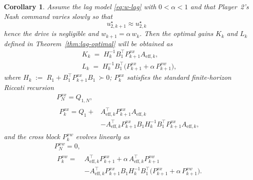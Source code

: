 \documentclass[letterpaper, 10 pt, conference]{ieeeconf}  %
\newtheorem{corollary}[theorem]{\textbf{Corollary}}
\begin{document}
\begin{corollary}
\label{cor:slow-varying-alpha}
Assume the lag model \eqref{eq:w-lag} with $0<\alpha<1$ and that Player~2’s Nash command varies slowly so that
\begin{equation}\label{eq:slow-drive}
u^{\star}_{2,k+1}\approx u^{\star}_{2,k}
\end{equation}
hence the drive is negligible and $w_{k+1} = \alpha\,w_k$. Then the optimal gains $K_k$ and $L_k$ defined in Theorem~\ref{thm:lag-optimal} will be obtained as
\begin{equation}
\begin{aligned}
&K_k \;=\; H_k^{-1} B_1^\top P_{k+1}^{xx} A_{\mathrm{eff},k}, \\
&L_k \;=\; H_k^{-1} B_1^\top \big(P_{k+1}^{xx} + \alpha\,P_{k+1}^{xw}\big), \label{eq:special case k}
\end{aligned}
\end{equation}
where $H_k \;:=\; R_1 + B_1^\top P_{k+1}^{xx} B_1 \ \succ 0$; $P_{k}^{xx}$ satisfies the standard finite-horizon Riccati recursion
\begin{equation}\label{eq:Riccati-Pxx}
\begin{aligned}
&P_N^{xx}=Q_{1,N},\\
&\begin{aligned}
P_k^{xx}=Q_1 + &A_{\mathrm{eff},k}^\top P_{k+1}^{xx} A_{\mathrm{eff},k}\\
&- A_{\mathrm{eff},k}^\top P_{k+1}^{xx} B_1 H_k^{-1} B_1^\top P_{k+1}^{xx} A_{\mathrm{eff},k},
\end{aligned}
\end{aligned}
\end{equation}
and the cross block $P_k^{xw}$ evolves linearly as
\begin{equation}\label{eq:Riccati-Pxw}
\begin{aligned}
&P_N^{xw}=0,\\
&\begin{aligned}
P_k^{xw} =\; &A_{\mathrm{eff},k}^\top P_{k+1}^{xx}
+ \alpha\,A_{\mathrm{eff},k}^\top P_{k+1}^{xw}\\
&- A_{\mathrm{eff},k}^\top P_{k+1}^{xx} B_1 H_k^{-1} B_1^\top \big(P_{k+1}^{xx}+\alpha\,P_{k+1}^{xw}\big).
\end{aligned}
\end{aligned}
\end{equation}
\end{corollary}
\end{document}
